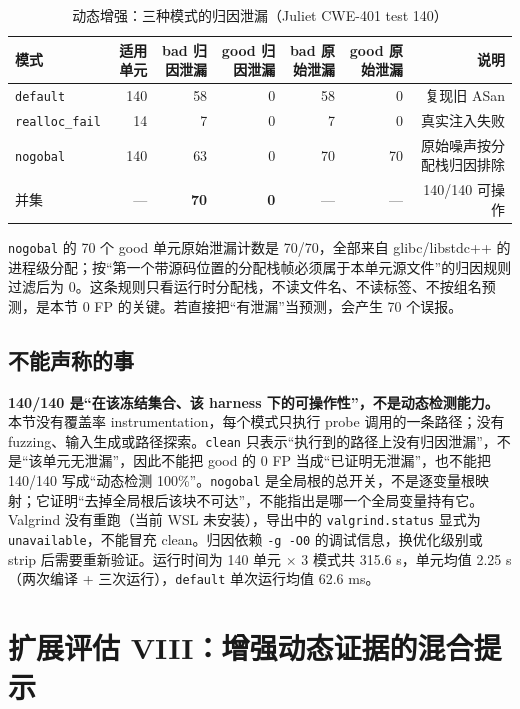 \documentclass[conference]{IEEEtran}
\begin{document}
\begin{table}[t]
\caption{动态增强：三种模式的归因泄漏（Juliet CWE-401 test 140）}
\label{tab:dyn-enh}
\centering
\scriptsize
\setlength{\tabcolsep}{3.5pt}
\begin{tabular}{@{}lrrrrrr@{}}
\toprule
模式 & 适用单元 & bad 归因泄漏 & good 归因泄漏 & bad 原始泄漏 & good 原始泄漏 & 说明\\
\midrule
\texttt{default} & 140 & 58 & 0 & 58 & 0 & 复现旧 ASan\\
\texttt{realloc\_fail} & 14 & 7 & 0 & 7 & 0 & 真实注入失败\\
\texttt{nogobal} & 140 & 63 & 0 & 70 & 70 & 原始噪声按分配栈归因排除\\
并集 & --- & \textbf{70} & \textbf{0} & --- & --- & 140/140 可操作\\
\bottomrule
\end{tabular}
\end{table}

\texttt{nogobal} 的 70 个 good 单元原始泄漏计数是 70/70，全部来自 glibc/libstdc++ 的进程级分配；按“第一个带源码位置的分配栈帧必须属于本单元源文件”的归因规则过滤后为 0。这条规则只看运行时分配栈，不读文件名、不读标签、不按组名预测，是本节 0 FP 的关键。若直接把“有泄漏”当预测，会产生 70 个误报。

\subsection{不能声称的事}

\textbf{140/140 是“在该冻结集合、该 harness 下的可操作性”，不是动态检测能力。}本节没有覆盖率 instrumentation，每个模式只执行 probe 调用的一条路径；没有 fuzzing、输入生成或路径探索。\texttt{clean} 只表示“执行到的路径上没有归因泄漏”，不是“该单元无泄漏”，因此不能把 good 的 0 FP 当成“已证明无泄漏”，也不能把 140/140 写成“动态检测 100\%”。\texttt{nogobal} 是全局根的总开关，不是逐变量根映射；它证明“去掉全局根后该块不可达”，不能指出是哪一个全局变量持有它。Valgrind 没有重跑（当前 WSL 未安装），导出中的 \texttt{valgrind.status} 显式为 \texttt{unavailable}，不能冒充 clean。归因依赖 \texttt{-g -O0} 的调试信息，换优化级别或 strip 后需要重新验证。运行时间为 140 单元 $\times$ 3 模式共 315.6 s，单元均值 2.25 s（两次编译 + 三次运行），\texttt{default} 单次运行均值 62.6 ms。

\section{扩展评估 VIII：增强动态证据的混合提示}
\label{sec:hde}
\end{document}
